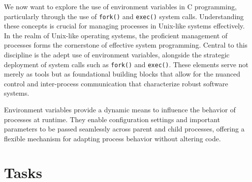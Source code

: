 \documentclass{dcbl/challenge}
\begin{document}
We now want to explore the use of environment variables in C programming, particularly through the use of \texttt{fork()} and \texttt{exec()} system calls. Understanding these concepts is crucial for managing processes in Unix-like systems effectively.
In the realm of Unix-like operating systems, the proficient management of processes forms the cornerstone of effective system programming. Central to this discipline is the adept use of environment variables, alongside the strategic deployment of system calls such as \texttt{fork()} and \texttt{exec()}. These elements serve not merely as tools but as foundational building blocks that allow for the nuanced control and inter-process communication that characterize robust software systems.

Environment variables provide a dynamic means to influence the behavior of processes at runtime. They enable configuration settings and important parameters to be passed seamlessly across parent and child processes, offering a flexible mechanism for adapting process behavior without altering code.

\section*{Tasks}
\end{document}

